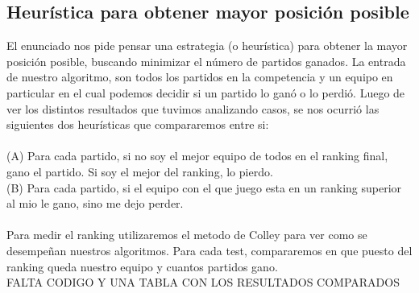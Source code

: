 \subsection{Heur\'istica para obtener mayor posici\'on posible}

El enunciado nos pide pensar una estrategia (o heur\'istica) para obtener la mayor posici\'on posible, buscando minimizar el n\'umero de partidos ganados. La entrada de nuestro algoritmo, son todos los partidos en la competencia y un equipo en particular en el cual podemos decidir si un partido lo gan\'o o lo perdi\'o. Luego de ver los distintos resultados que tuvimos analizando casos, se nos ocurri\'o las siguientes dos heur\'isticas que compararemos entre si:\\
\\
(A) Para cada partido, si no soy el mejor equipo de todos en el ranking final, gano el partido. Si soy el mejor del ranking, lo pierdo.\\
(B) Para cada partido, si el equipo con el que juego esta en un ranking superior al mio le gano, sino me dejo perder.\\
\\
Para medir el ranking utilizaremos el metodo de Colley para ver como se desempe\~nan nuestros algoritmos. Para cada test, compararemos en que puesto del ranking queda nuestro equipo y cuantos partidos gano.\\
FALTA CODIGO Y UNA TABLA CON LOS RESULTADOS COMPARADOS\\